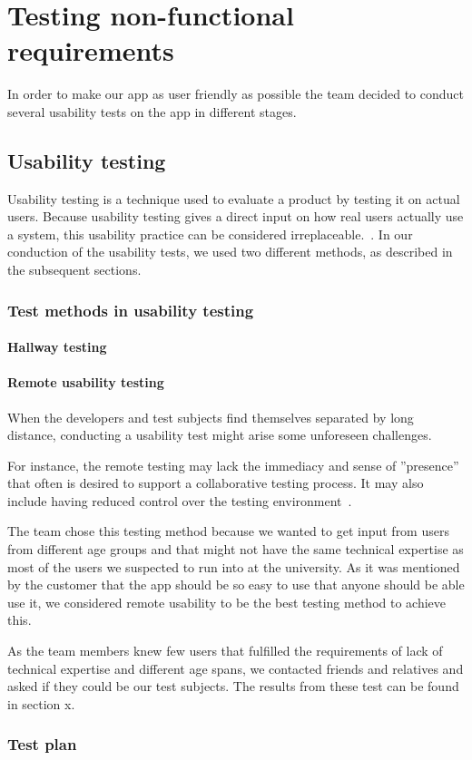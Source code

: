 \section{Testing non-functional requirements}
\label{sec:testingnonfunctionalrequirements}
In order to make our app as user friendly as possible the team decided to conduct several usability tests on the app in different stages.

\subsection{Usability testing}
\label{sec:userTest}

Usability testing is a technique used to evaluate a product by testing it on actual users. Because usability testing gives a direct input on how real users actually use a system, this usability practice can be considered irreplaceable.~\cite{usability}. In our conduction of the usability tests, we used two different methods, as described in the subsequent sections.

\subsubsection{Test methods in usability testing}

\paragraph{Hallway testing}

\paragraph{Remote usability testing}
When the developers and test subjects find themselves separated by long distance, conducting a usability test might arise some unforeseen challenges.

For instance, the remote testing may lack the immediacy and sense of ''presence'' that often is desired to support a collaborative testing process. It may also include having reduced control over the testing environment~\cite{remoteTest}. 

The team chose this testing method because we wanted to get input from users from different age groups and that might not have the same technical expertise as most of the users we suspected to run into at the university. As it was mentioned by the customer that the app should be so easy to use that anyone should be able use it, we considered remote usability to be the best testing method to achieve this.

As the team members knew few users that fulfilled the requirements of lack of technical expertise and different age spans, we contacted friends and relatives and asked if they could be our test subjects. The results from these test can be found in section x.

\subsubsection{Test plan}
